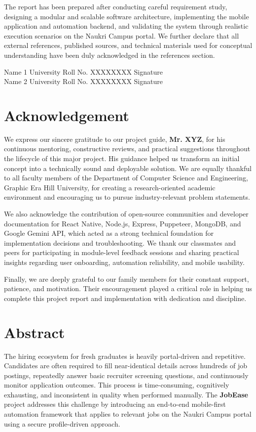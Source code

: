 \documentclass[12pt,a4paper,oneside]{report}
\begin{document}
The report has been prepared after conducting careful requirement study, designing a modular and scalable software architecture, implementing the mobile application and automation backend, and validating the system through realistic execution scenarios on the Naukri Campus portal. We further declare that all external references, published sources, and technical materials used for conceptual understanding have been duly acknowledged in the references section.

\vspace{1.2cm}
\noindent Name 1 \hfill University Roll No. XXXXXXXX \hfill Signature\\[1.0cm]
\noindent Name 2 \hfill University Roll No. XXXXXXXX \hfill Signature

\chapter*{Acknowledgement}
We express our sincere gratitude to our project guide, \textbf{Mr. XYZ}, for his continuous mentoring, constructive reviews, and practical suggestions throughout the lifecycle of this major project. His guidance helped us transform an initial concept into a technically sound and deployable solution. We are equally thankful to all faculty members of the Department of Computer Science and Engineering, Graphic Era Hill University, for creating a research-oriented academic environment and encouraging us to pursue industry-relevant problem statements.

We also acknowledge the contribution of open-source communities and developer documentation for React Native, Node.js, Express, Puppeteer, MongoDB, and Google Gemini API, which acted as a strong technical foundation for implementation decisions and troubleshooting. We thank our classmates and peers for participating in module-level feedback sessions and sharing practical insights regarding user onboarding, automation reliability, and mobile usability.

Finally, we are deeply grateful to our family members for their constant support, patience, and motivation. Their encouragement played a critical role in helping us complete this project report and implementation with dedication and discipline.

\chapter*{Abstract}
The hiring ecosystem for fresh graduates is heavily portal-driven and repetitive. Candidates are often required to fill near-identical details across hundreds of job postings, repeatedly answer basic recruiter screening questions, and continuously monitor application outcomes. This process is time-consuming, cognitively exhausting, and inconsistent in quality when performed manually. The \textbf{JobEase} project addresses this challenge by introducing an end-to-end mobile-first automation framework that applies to relevant jobs on the Naukri Campus portal using a secure profile-driven approach.
\end{document}

